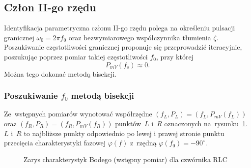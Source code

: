 \documentclass[paper=a4,DIV=12]{lpas}
\newcommand{\degree}{^{\circ}}
\begin{document}
\begin{appendices}
  \subsection{Człon II-go rzędu}
  \label{sec:YDUPM}

  Identyfikacja parametryczna członu II-go rzędu polega na określeniu pulsacji
  granicznej $\omega_0 = 2 \pi f_0$ oraz bezwymiarowego współczynnika tłumienia
  $\zeta$. Poszukiwanie częstotliwości granicznej proponuje się przeprowadzić
  iteracyjnie, poszukując poprzez pomiar takiej częstotliwości $f_0$, przy
  której
  \begin{equation}
    P_{mV}(f_s) \approx 0.
    \label{eq:8AO8B}
  \end{equation}
  Można tego dokonać metodą bisekcji.

  \subsubsection{Poszukiwanie $f_0$ metodą bisekcji}
  \label{sec:HVY4X}

  Ze~wstępnych pomiarów wynotować współrzędne $(f_L, P_L) = (f_L, P_{mV}(f_L))$
  oraz $(f_R, P_R) = (f_R, P_{mV}(f_R))$ punktów~$L$ i~$R$ oznaczonych
  na~rysunku~\ref{fig:WC8TU}. $L$ i~$R$ to najbliższe punkty odpowiednio po lewej
  i prawej stronie punktu przecięcia charakterystyki fazowej $\varphi(f)$
  z~rzędną $\varphi(f_0) = - 90\degree$.

  \begin{figure}[H]
    \centering
    
    \caption{Zarys charakterystyk Bodego (wstępny pomiar) dla czwórnika RLC}
    \label{fig:WC8TU}
  \end{figure}


\end{appendices}
\end{document}

